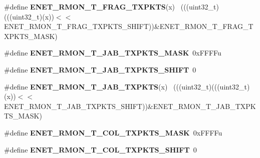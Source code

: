 \begin{DoxyCompactItemize}
\item 
\hypertarget{group___e_n_e_t___register___masks_ga577d67162eb2707c0394a0d93e945cf1}{}\#define {\bfseries E\+N\+E\+T\+\_\+\+R\+M\+O\+N\+\_\+\+T\+\_\+\+F\+R\+A\+G\+\_\+\+T\+X\+P\+K\+T\+S}(x)                          ~(((uint32\+\_\+t)(((uint32\+\_\+t)(x))$<$$<$E\+N\+E\+T\+\_\+\+R\+M\+O\+N\+\_\+\+T\+\_\+\+F\+R\+A\+G\+\_\+\+T\+X\+P\+K\+T\+S\+\_\+\+S\+H\+I\+F\+T))\&E\+N\+E\+T\+\_\+\+R\+M\+O\+N\+\_\+\+T\+\_\+\+F\+R\+A\+G\+\_\+\+T\+X\+P\+K\+T\+S\+\_\+\+M\+A\+S\+K)\label{group___e_n_e_t___register___masks_ga577d67162eb2707c0394a0d93e945cf1}

\item 
\hypertarget{group___e_n_e_t___register___masks_ga94c366b90093533c7f2149d62fa72133}{}\#define {\bfseries E\+N\+E\+T\+\_\+\+R\+M\+O\+N\+\_\+\+T\+\_\+\+J\+A\+B\+\_\+\+T\+X\+P\+K\+T\+S\+\_\+\+M\+A\+S\+K}~0x\+F\+F\+F\+Fu\label{group___e_n_e_t___register___masks_ga94c366b90093533c7f2149d62fa72133}

\item 
\hypertarget{group___e_n_e_t___register___masks_gac8ba73230f05449d87137e0a0c32d72a}{}\#define {\bfseries E\+N\+E\+T\+\_\+\+R\+M\+O\+N\+\_\+\+T\+\_\+\+J\+A\+B\+\_\+\+T\+X\+P\+K\+T\+S\+\_\+\+S\+H\+I\+F\+T}~0\label{group___e_n_e_t___register___masks_gac8ba73230f05449d87137e0a0c32d72a}

\item 
\hypertarget{group___e_n_e_t___register___masks_gaa74f3fa1d853869b4db93ce6ebc2df90}{}\#define {\bfseries E\+N\+E\+T\+\_\+\+R\+M\+O\+N\+\_\+\+T\+\_\+\+J\+A\+B\+\_\+\+T\+X\+P\+K\+T\+S}(x)                            ~(((uint32\+\_\+t)(((uint32\+\_\+t)(x))$<$$<$E\+N\+E\+T\+\_\+\+R\+M\+O\+N\+\_\+\+T\+\_\+\+J\+A\+B\+\_\+\+T\+X\+P\+K\+T\+S\+\_\+\+S\+H\+I\+F\+T))\&E\+N\+E\+T\+\_\+\+R\+M\+O\+N\+\_\+\+T\+\_\+\+J\+A\+B\+\_\+\+T\+X\+P\+K\+T\+S\+\_\+\+M\+A\+S\+K)\label{group___e_n_e_t___register___masks_gaa74f3fa1d853869b4db93ce6ebc2df90}

\item 
\hypertarget{group___e_n_e_t___register___masks_ga2acdc948ff9f17ae66ed9efd053cf3f4}{}\#define {\bfseries E\+N\+E\+T\+\_\+\+R\+M\+O\+N\+\_\+\+T\+\_\+\+C\+O\+L\+\_\+\+T\+X\+P\+K\+T\+S\+\_\+\+M\+A\+S\+K}~0x\+F\+F\+F\+Fu\label{group___e_n_e_t___register___masks_ga2acdc948ff9f17ae66ed9efd053cf3f4}

\item 
\hypertarget{group___e_n_e_t___register___masks_ga04f557da802770a52c52f3e7eda944de}{}\#define {\bfseries E\+N\+E\+T\+\_\+\+R\+M\+O\+N\+\_\+\+T\+\_\+\+C\+O\+L\+\_\+\+T\+X\+P\+K\+T\+S\+\_\+\+S\+H\+I\+F\+T}~0\label{group___e_n_e_t___register___masks_ga04f557da802770a52c52f3e7eda944de}


\end{DoxyCompactItemize}
